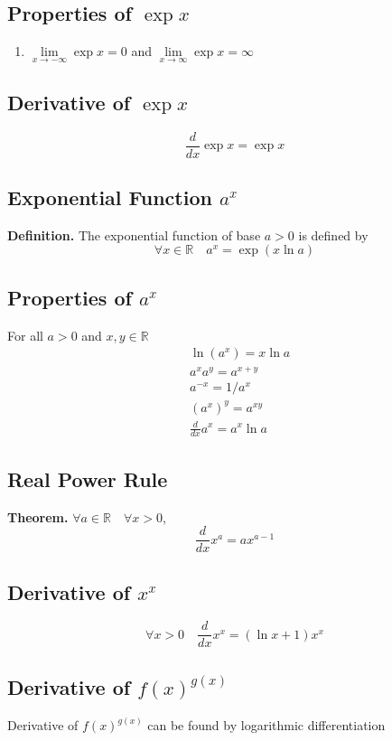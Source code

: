 \documentclass[../ma2002_notes.tex]{subfiles}
\begin{document}
\subsection{Properties of $\exp x$}
\begin{enumerate}
	\item\(\lim\limits_{x\to-\infty}\exp x=0\) and \(\lim\limits_{x\to\infty}\exp x=\infty\)
\end{enumerate}

\subsection{Derivative of $\exp x$}
\[\frac{d}{dx}\exp x=\exp x\]

\subsection{Exponential Function $a^x$}
\textbf{Definition.} The exponential function of base \(a>0\) is defined by
\[\forall x\in\mathbb{R}\quad a^x=\exp(x\ln a)\]

\subsection{Properties of $a^x$}
For all \(a>0\) and \(x,y\in\mathbb{R}\)
\begin{align*}
	&\ln(a^x)=x\ln a\\
	&a^xa^y=a^{x+y}\\
	&a^{-x}=1/a^x\\
	&(a^x)^y=a^{xy}\\
	&\frac{d}{dx}a^x=a^x\ln a
\end{align*}

\subsection{Real Power Rule}
\textbf{Theorem.} \(\forall a\in\mathbb{R}\quad\forall x>0\),
\[\frac{d}{dx}x^a=ax^{a-1}\]

\subsection{Derivative of $x^x$}
\[\forall x>0\quad\frac{d}{dx}x^x=(\ln x+1)x^x\]

\subsection{Derivative of $f(x)^{g(x)}$}
Derivative of \(f(x)^{g(x)}\) can be found by logarithmic differentiation
\end{document}
